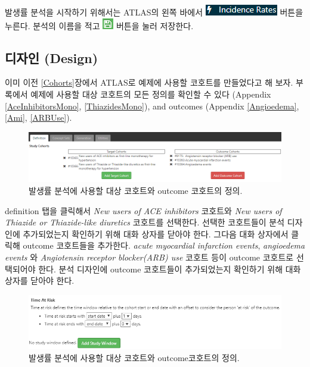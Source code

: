 \documentclass[11pt]{book}
\theoremstyle{definition}
\theoremstyle{definition}
\theoremstyle{definition}
\theoremstyle{remark}
\begin{document}
발생률 분석을 시작하기 위해서는 ATLAS의 왼쪽 바에서
\includegraphics{images/Characterization/atlasIncidenceMenuItem.png}
버튼을 누른다. 분석의 이름을 적고
\includegraphics{images/PopulationLevelEstimation/save.png} 버튼을 눌러
저장한다.

\subsection{디자인 (Design)}\label{-design-2}

이미 이전 \ref{Cohorts}장에서 ATLAS로 예제에 사용할 코호트를 만들었다고
해 보자. 부록에서 예제에 사용할 대상 코호트의 모든 정의를 확인할 수 있다
(Appendix \ref{AceInhibitorsMono}, \ref{ThiazidesMono}), and outcomes
(Appendix \ref{Angioedema}, \ref{Ami}, \ref{ARBUse}).

\begin{figure}

{\centering \includegraphics[width=1\linewidth]{images/Characterization/atlasIncidenceCohortSelection} 

}

\caption{발생률 분석에 사용할 대상 코호트와 outcome 코호트의 정의.}\label{fig:atlasIncidenceCohortSelection}
\end{figure}

definition 탭을 클릭해서 \emph{New users of ACE inhibitors} 코호트와
\emph{New users of Thiazide or Thiazide-like diuretics} 코호트를
선택한다. 선택한 코호트들이 분석 디자인에 추가되었는지 확인하기 위해
대화 상자를 닫아야 한다. 그다음 대화 상자에서 클릭해 outcome 코호트들을
추가한다. \emph{acute myocardial infarction events}, \emph{angioedema
events} 와 \emph{Angiotensin receptor blocker(ARB) use} 코호트 등이
outcome 코호트로 선택되어야 한다. 분석 디자인에 outcome 코호트들이
추가되었는지 확인하기 위해 대화 상자를 닫아야 한다.

\begin{figure}

{\centering \includegraphics[width=1\linewidth]{images/Characterization/atlasIncidenceTimeAtRisk} 

}

\caption{발생률 분석에 사용할 대상 코호트와 outcome코호트의 정의.}\label{fig:atlasIncidenceTimeAtRisk}
\end{figure}
\end{document}
